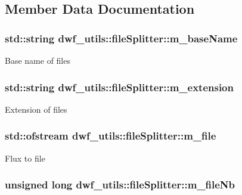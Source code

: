 \subsection{\-Member \-Data \-Documentation}
\hypertarget{classdwf__utils_1_1file_splitter_a975b8db38b39f88d3169465681004b3f}{
\subsubsection[{m\-\_\-base\-Name}]{\setlength{\rightskip}{0pt plus 5cm}std\-::string {\bf dwf\-\_\-utils\-::file\-Splitter\-::m\-\_\-base\-Name}}}\label{classdwf__utils_1_1file_splitter_a975b8db38b39f88d3169465681004b3f}
\-Base name of files \hypertarget{classdwf__utils_1_1file_splitter_a41488fca3cd05509e44b83158bc928c2}{
\subsubsection[{m\-\_\-extension}]{\setlength{\rightskip}{0pt plus 5cm}std\-::string {\bf dwf\-\_\-utils\-::file\-Splitter\-::m\-\_\-extension}}}\label{classdwf__utils_1_1file_splitter_a41488fca3cd05509e44b83158bc928c2}
\-Extension of files \hypertarget{classdwf__utils_1_1file_splitter_a52f6c1e3f991d724a0388479b1311eba}{
\subsubsection[{m\-\_\-file}]{\setlength{\rightskip}{0pt plus 5cm}std\-::ofstream {\bf dwf\-\_\-utils\-::file\-Splitter\-::m\-\_\-file}}}\label{classdwf__utils_1_1file_splitter_a52f6c1e3f991d724a0388479b1311eba}
\-Flux to file \hypertarget{classdwf__utils_1_1file_splitter_a8b18118f349455a6b7eeacb32005a871}{
\subsubsection[{m\-\_\-file\-Nb}]{\setlength{\rightskip}{0pt plus 5cm}unsigned long {\bf dwf\-\_\-utils\-::file\-Splitter\-::m\-\_\-file\-Nb}}}\label{classdwf__utils_1_1file_splitter_a8b18118f349455a6b7eeacb32005a871}
